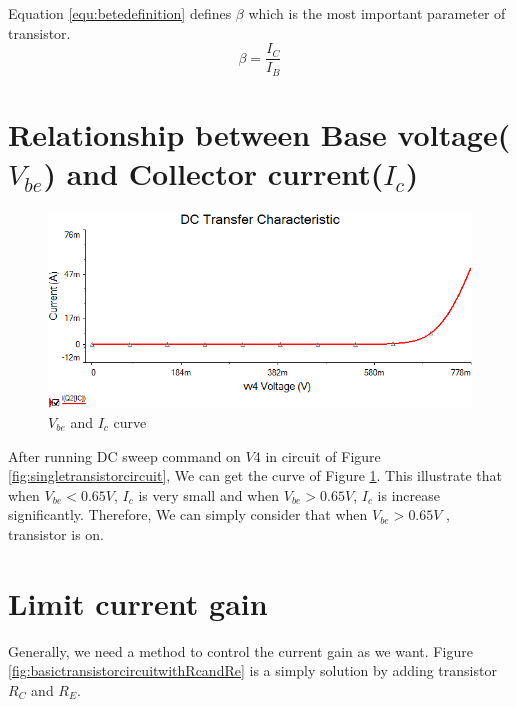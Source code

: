  Equation \ref{equ:betedefinition} defines $\beta$ which is the most important parameter of transistor.  
\begin{equation}
\beta = \frac{I_C}{I_B}
\label{equ:betedefinition}
\end{equation}

\section{Relationship between Base voltage($ V_{be} $) and Collector current($ I_c $)}

\begin{figure}[htbp]
  \centering
  \includegraphics[scale=0.6]{"../Photo/Chap1/Vbe and Ic curve"}
  \caption{$ V_{be} $ and $ I_c $ curve}
  \label{fig:VbeandIccurve}
\end{figure}

After running DC sweep command on $ V4 $ in circuit of Figure \ref{fig:singletransistorcircuit}, We can get the curve of Figure \ref{fig:VbeandIccurve}. This illustrate that when $ V_{be} < 0.65V $, $ I_c $ is very small and when $ V_{be} > 0.65V $, $ I_c $ is increase significantly. Therefore, We can simply consider that when $ V_{be} > 0.65V$ , transistor is on.


\section{Limit current gain} 
Generally, we need a method to control the current gain as we want. Figure \ref{fig:basictransistorcircuitwithRcandRe} is a simply solution by adding transistor $R_C$ and $R_E$.

